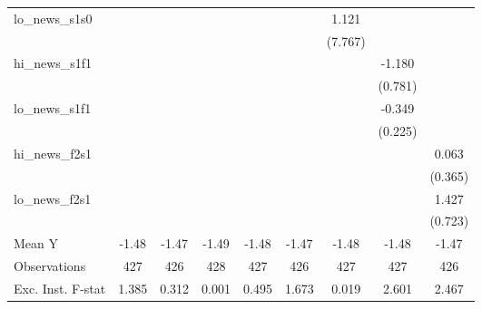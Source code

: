{\begin{tabular}{l*{8}{c}}
\addlinespace
lo\_news\_s1s0&                     &                     &                     &                     &                     &       1.121         &                     &                     \\
            &                     &                     &                     &                     &                     &     (7.767)         &                     &                     \\
\addlinespace
hi\_news\_s1f1&                     &                     &                     &                     &                     &                     &      -1.180         &                     \\
            &                     &                     &                     &                     &                     &                     &     (0.781)         &                     \\
\addlinespace
lo\_news\_s1f1&                     &                     &                     &                     &                     &                     &      -0.349         &                     \\
            &                     &                     &                     &                     &                     &                     &     (0.225)         &                     \\
\addlinespace
hi\_news\_f2s1&                     &                     &                     &                     &                     &                     &                     &       0.063         \\
            &                     &                     &                     &                     &                     &                     &                     &     (0.365)         \\
\addlinespace
lo\_news\_f2s1&                     &                     &                     &                     &                     &                     &                     &       1.427\sym{**} \\
            &                     &                     &                     &                     &                     &                     &                     &     (0.723)         \\
\midrule
Mean Y      &       -1.48         &       -1.47         &       -1.49         &       -1.48         &       -1.47         &       -1.48         &       -1.48         &       -1.47         \\
Observations&         427         &         426         &         428         &         427         &         426         &         427         &         427         &         426         \\
Exc. Inst. F-stat&       1.385         &       0.312         &       0.001         &       0.495         &       1.673         &       0.019         &       2.601         &       2.467         \\
\bottomrule
\end{tabular}
}
